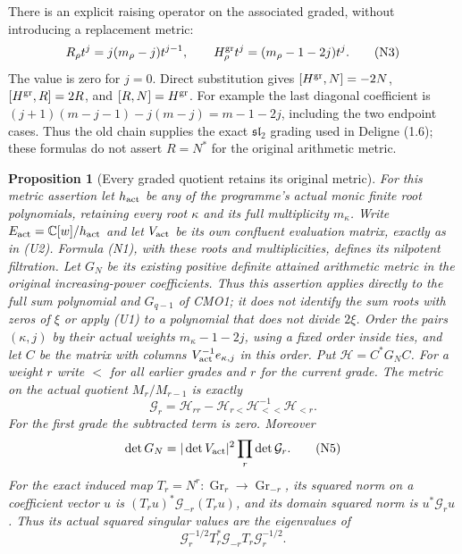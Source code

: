 \documentclass[11pt]{article}
\newtheorem{proposition}[theorem]{Proposition}
\newcommand{\C}{\mathbb C}\newcommand{\R}{\mathbb R}
\begin{document}
There is an explicit raising operator on the associated graded, without
introducing a replacement metric:
\[
 R_\rho t^j=j(m_\rho-j)t^{j-1},\qquad
 H_\rho^{\rm gr}t^j=(m_\rho-1-2j)t^j.
 \tag{N3}
\]
The value is zero for $j=0$. Direct substitution gives
$[H^{\rm gr},N]=-2N$, $[H^{\rm gr},R]=2R$, and
$[R,N]=H^{\rm gr}$. For example the last diagonal coefficient is
$(j+1)(m-j-1)-j(m-j)=m-1-2j$, including the two endpoint cases.
Thus the old chain supplies the exact $\mathfrak{sl}_2$ grading used
in Deligne (1.6); these formulas do not assert $R=N^*$ for the original
arithmetic metric.

\begin{proposition}[Every graded quotient retains its original metric]
For this metric assertion let $h_{\rm act}$ be any of the programme's
actual monic finite root polynomials, retaining every root $\kappa$
and its full multiplicity $m_\kappa$. Write
$E_{\rm act}=\C[w]/h_{\rm act}$ and let $V_{\rm act}$ be its own
confluent evaluation matrix, exactly as in (U2). Formula (N1), with
these roots and multiplicities, defines its nilpotent filtration.
Let $G_N$ be its existing positive definite attained arithmetic metric
in the original increasing-power coefficients. Thus this assertion
applies directly to the full sum polynomial and $G_{q-1}$ of CMO1;
it does not identify the sum roots with zeros of $\xi$ or apply (U1)
to a polynomial that does not divide $2\xi$.
Order the pairs $(\kappa,j)$ by their actual weights
$m_\kappa-1-2j$, using a fixed order inside ties, and let $C$ be
the matrix with columns $V_{\rm act}^{-1}e_{\kappa,j}$ in this order.
Put $\mathcal H=C^*G_NC$. For a weight $r$ write $<$ for all earlier
grades and $r$ for the current grade. The metric on the actual quotient
$M_r/M_{r-1}$ is exactly
\[
 \mathcal G_r=\mathcal H_{rr}
      -\mathcal H_{r<}\mathcal H_{<<}^{-1}\mathcal H_{<r}.
 \tag{N4}
\]
For the first grade the subtracted term is zero. Moreover
\[
 \det G_N=|\det V_{\rm act}|^2\prod_r\det\mathcal G_r.
 \tag{N5}
\]
For the exact induced map $T_r=N^r:\operatorname{Gr}_r\to
\operatorname{Gr}_{-r}$, its squared norm on a coefficient vector $u$
is $(T_ru)^*\mathcal G_{-r}(T_ru)$, and its domain squared norm is
$u^*\mathcal G_ru$. Thus its actual squared singular values are the
eigenvalues of
\[
 \mathcal G_r^{-1/2}T_r^*\mathcal G_{-r}T_r
                  \mathcal G_r^{-1/2}.
 \tag{N6}
\]
\end{proposition}
\end{document}
